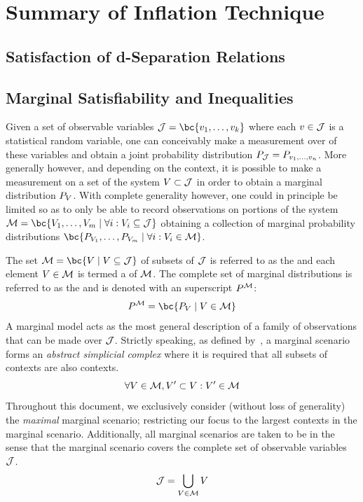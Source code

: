 \documentclass[aps, 10pt, english, twoside, pra, nofootinbib, tightenlines, longbibliography, superscriptaddress]{revtex4-1}
\begin{document}
    \clearpage
    \appendix

    \section{Summary of Inflation Technique}
    \label{sec:inflation_technique}

    \subsection{Satisfaction of d-Separation Relations}
    \label{sec:satisfaction_of_d_sep_relations}

    \subsection{Marginal Satisfiability and Inequalities}
    \label{sec:marginal_satisfiability}
    \label{sec:marginal_linear}\label{sec:linear_programs}

    Given a set of observable variables $\jointvar = \bc{v_1, \ldots, v_k}$ where each $v \in \mathcal{J}$ is a statistical random variable, one can conceivably make a measurement over of these variables and obtain a joint probability distribution $\prob[\jointvar] = \prob[v_1,\ldots,v_n]$. More generally however, and depending on the context, it is possible to make a measurement on a set of the system $V \subset \mathcal{J}$ in order to obtain a marginal distribution $\prob[V]$. With complete generality however, one could in principle be limited so as to only be able to record observations on portions of the system $\mscenario = \bc{V_1, \ldots, V_m \mid \forall i : V_i \subseteq \jointvar}$ obtaining a collection of marginal probability distributions $\bc{\prob[V_1], \ldots, \prob[V_m] \mid \forall i: V_i \in \mscenario}$.

    The set $\mscenario = \bc{V \mid V \subseteq \jointvar}$ of subsets of $\mathcal{J}$ is referred to as the  and each element $V \in \mathcal{M}$ is termed a  of $\mathcal{M}$. The complete set of marginal distributions is referred to as the  and is denoted with an superscript $\prob^{\mscenario}$:
    \[ \prob^{\mscenario} = \bc{\prob[V] \mid V \in \mscenario} \]
    A marginal model acts as the most general description of a family of observations that can be made over $\mathcal{J}$. Strictly speaking, as defined by~\cite{Fritz_2011}, a marginal scenario forms an \textit{abstract simplicial complex} where it is required that all subsets of contexts are also contexts.
    \[ \forall V \in \mathcal{M}, V' \subset V : V' \in \mathcal{M} \]
    Throughout this document, we exclusively consider (without loss of generality) the \textit{maximal} marginal scenario; restricting our focus to the largest contexts in the marginal scenario. Additionally, all marginal scenarios are taken to be  in the sense that the marginal scenario covers the complete set of observable variables $\mathcal{J}$.
    \[ \mathcal{J} = \bigcup_{V \in \mathcal{M}} V \]
\end{document}
